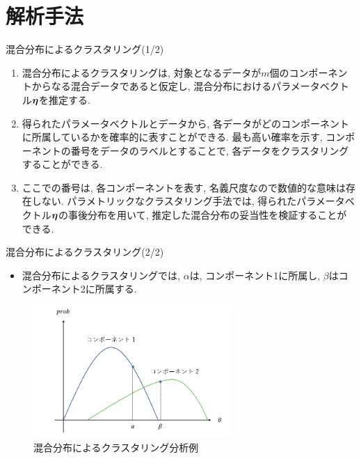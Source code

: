 \documentclass[dvipdfmx]{beamer} %
\newcommand{\bm}[1]{\mbox{\boldmath $#1$}}
\begin{document}
\section{解析手法}
\begin{frame}{混合分布によるクラスタリング(1/2)}
\begin{enumerate}
\item
混合分布によるクラスタリングは, 対象となるデータが$m$個のコンポーネントからなる混合データであると仮定し, 混合分布におけるパラメータベクトル$\bm \eta$を推定する. 
\item
得られたパラメータベクトルとデータから, 各データがどのコンポーネントに所属しているかを確率的に表すことができる. 最も高い確率を示す, コンポーネントの番号をデータのラベルとすることで, 各データをクラスタリングすることができる.　
\item
ここでの番号は, 各コンポーネントを表す, 名義尺度なので数値的な意味は存在しない. パラメトリックなクラスタリング手法では, 得られたパラメータベクトル$\bm \eta$の事後分布を用いて, 推定した混合分布の妥当性を検証することができる.	
 
\end{enumerate}

\end{frame}

\begin{frame}{混合分布によるクラスタリング(2/2)}

\begin{itemize}
	\item 混合分布によるクラスタリングでは, $\alpha$は, コンポーネント1に所属し, $\beta$はコンポーネント2に所属する.
\end{itemize}
\begin{figure}[tbp]
\begin{center}
\includegraphics[clip,height= 50mm]{data/mix_cluster.png}
\end{center}
\caption{混合分布によるクラスタリング分析例}
\label{mix_cluster}
\end{figure}


\end{frame}
\end{document}
